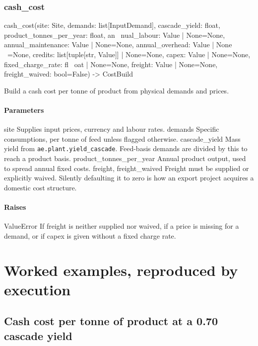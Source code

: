 \documentclass[10pt,a4paper,twoside]{report}
\begin{document}
\subsubsection*{cash\_cost}

\begin{verbatimsmall}
cash_cost(site: Site, demands: list[InputDemand], cascade_yield: float, product_tonnes_per_year: float, an
    \ nual_labour: Value | None=None, annual_maintenance: Value | None=None, annual_overhead: Value | None
    \ =None, credits: list[tuple[str, Value]] | None=None, capex: Value | None=None, fixed_charge_rate: fl
    \ oat | None=None, freight: Value | None=None, freight_waived: bool=False) -> CostBuild
\end{verbatimsmall}

Build a cash cost per tonne of product from physical demands and prices.

\paragraph*{Parameters}

site Supplies input prices, currency and labour rates. demands Specific consumptions, per tonne of feed unless flagged otherwise. cascade\_yield Mass yield from \texttt{ae.plant.yield\_cascade}. Feed-basis demands are divided by this to reach a product basis. product\_tonnes\_per\_year Annual product output, used to spread annual fixed costs. freight, freight\_waived Freight must be supplied or explicitly waived. Silently defaulting it to zero is how an export project acquires a domestic cost structure.

\paragraph*{Raises}

ValueError If freight is neither supplied nor waived, if a price is missing for a demand, or if capex is given without a fixed charge rate.

\section{Worked examples, reproduced by execution}

\subsection*{Cash cost per tonne of product at a 0.70 cascade yield}
\end{document}
